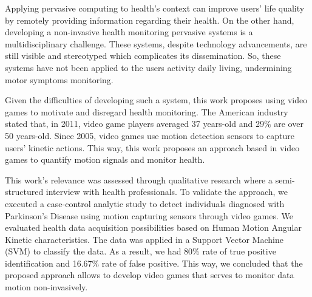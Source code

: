 Applying pervasive computing to health's context can improve users' life quality by remotely providing information regarding their health. On the other hand, developing a non-invasive health monitoring pervasive systems is a multidisciplinary challenge. These systems, despite technology advancements, are still visible and stereotyped which complicates its dissemination. So, these systems have not been applied to the users activity daily living, undermining motor symptoms monitoring.

 Given the difficulties of developing such a system, this work proposes using video games to motivate and disregard health monitoring. The American industry stated that, in 2011, video game players averaged 37 years-old and 29\% are over 50 years-old. Since 2005, video games use motion detection sensors to capture users' kinetic actions. This way, this work proposes an approach based in video games to quantify motion signals and monitor health.

 This work's relevance was assessed through qualitative research where a semi-structured interview with health professionals. To validate the approach, we executed a case-control analytic study to detect individuals diagnosed with Parkinson's Disease using motion capturing sensors through video games. We evaluated health data acquisition possibilities based on Human Motion Angular Kinetic characteristics. The data was applied in a Support Vector Machine (SVM) to classify the data. As a result, we had 80\% rate of true positive identification and 16.67\% rate of false positive. This way, we concluded that the proposed approach allows to develop video games that serves to monitor data motion non-invasively.
